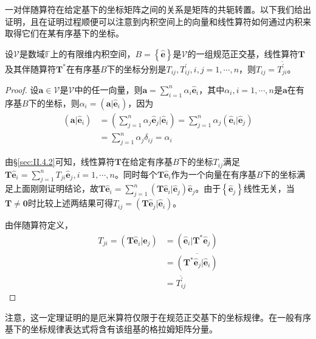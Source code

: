 \documentclass[main.tex]{subfiles}
\begin{document}
一对伴随算符在给定基下的坐标矩阵之间的关系是矩阵的共轭转置。以下我们给出证明，且在证明过程顺便可以注意到内积空间上的向量和线性算符如何通过内积来取得它们在某有序基下的坐标。

\begin{theorem}
设$\mathcal{V}$是数域$\mathbb{F}$上的有限维内积空间，$B=\left\{\mathbf{\hat{e}}\right\}$是$\mathcal{V}$的一组规范正交基，线性算符$\mathbf{T}$及其伴随算符$\mathbf{T}^*$在有序基$B$下的坐标分别是$T_{ij},T^\prime_{ij},i,j=1,\cdots,n$，则$T_{ij}=\overline{T^\prime_{ji}}$。
\end{theorem}
\begin{proof}
设$\mathbf{a}\in\mathcal{V}$是$\mathcal{V}$中的任一向量，则$\mathbf{a}=\sum_{i=1}^n\alpha_i\mathbf{\hat{e}}_i$，其中$\alpha_i,i=1,\cdots,n$是$\mathbf{a}$在有序基$B$下的坐标，则$\alpha_i=\left(\mathbf{a}|\mathbf{\hat{e}}_i\right)$，因为
\begin{align*}
\left(\mathbf{a}|\mathbf{\hat{e}}_i\right)&=\left(\sum_{j=1}^n\alpha_j\mathbf{\hat{e}}_j|\mathbf{\hat{e}}_i\right)=\sum_{j=1}^n\alpha_j\left(\mathbf{\hat{e}}_i|\mathbf{\hat{e}}_j\right)
\\&=\sum_{j=1}^n\alpha_j\delta_{ij}=\alpha_i
\end{align*}

由\S\ref{sec:II.4.2}可知，线性算符$\mathbf{T}$在给定有序基$B$下的坐标$T_{ij}$满足$\mathbf{T\hat{e}}_i=\sum_{j=1}^nT_{ji}\mathbf{\hat{e}}_j,i=1,\cdots,n$。同时每个$\mathbf{T\hat{e}}_i$作为一个向量在有序基$B$下的坐标满足上面刚刚证明结论，故$\mathbf{T\hat{e}}_i=\sum_{j=1}^n\left(\mathbf{T\hat{e}}_i|\mathbf{\hat{e}}_j\right)\mathbf{\hat{e}}_j$。由于$\left\{\mathbf{\hat{e}}_j\right\}$线性无关，当$\mathbf{T}\neq\mathbf{0}$时比较上述两结果可得$T_{ij}=\left(\mathbf{T\hat{e}}_j|\mathbf{\hat{e}}_i\right)$。

由伴随算符定义，
\begin{align*}
    T_{ji}=\left(\mathbf{T\hat{e}}_i|\mathbf{\hat{e}}_j\right)&=\left(\mathbf{\hat{e}}_i|\mathbf{T}^*\mathbf{\hat{e}}_j\right)\\
    &=\overline{\left(\mathbf{T}^*\mathbf{\hat{e}}_j|\mathbf{\hat{e}}_i\right)}\\
    &=\overline{T^\prime_{ij}}
\end{align*}
\end{proof}

注意，这一定理证明的是厄米算符仅限于在规范正交基下的坐标规律。在一般有序基下的坐标规律表达式将含有该组基的格拉姆矩阵分量。
\end{document}
